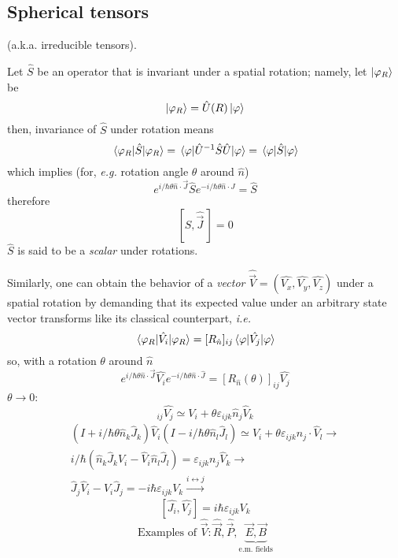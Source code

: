 \documentclass[12pt]{article}
\newcommand{\be}{\begin{equation}}
\newcommand{\ee}{\end{equation}}
\begin{document}
\subsection{Spherical tensors}

(a.k.a. irreducible tensors).

Let $\hat{S}$ be an operator that is invariant under a
spatial rotation; namely, let $\ket{\varphi_R}$ be
\be
\ket{\varphi_R} = \hat{U}(R)\ket{\varphi}
\ee
then, invariance of $\hat{S}$ under rotation means
\be
\ev*{\hat{S}}{\varphi_R} = \ev*{\hat{U}^{-1}\hat{S}\hat{U}} {\varphi}= \ev*{\hat{S}}{\varphi}
\ee
which implies (for, \textit{e.g.} rotation angle $\theta$ around $\hat{n}$)
\be
e^{i / \hbar \theta \hat{n} \cdot \vec{J}} \hat{S} e^{-i / \hbar \theta \hat{n} \cdot \hat{J}}=\hat{S}
\ee
therefore
\be
\left[\hat{S},\hat{\vec{J}}\,\right] = 0
\ee
$\hat{S}$ is said to be a \emph{scalar} under rotations.

Similarly, one can obtain the behavior of a \emph{vector}
$\hat{\vec{V}} = (\hat{V_x},\hat{V_y},\hat{V_z})$ under a spatial rotation by
demanding that its expected value under an
arbitrary state vector transforms like its classical
counterpart, \textit{i.e.}
\be
\ev*{\hat{V_i}}{\varphi_R} = [R_{\hat n}]_{ij}\ev*{\hat{V_j}}{\varphi}
\ee
so, with a rotation $\theta$ around $\hat{n}$
\be
e^{i / \hbar \theta \hat{n} \cdot \vec{J}} \hat{V_i} e^{-i / \hbar \theta \hat{n} \cdot \hat{J}}=
[R_{\hat n}(\theta)]_{ij}\hat{V_j}
\ee
$\theta \to 0$:
\be
[R_{\hat n}(\theta)]_{ij}\hat{V_j}
\simeq V_i + \theta \varepsilon_{i j k} \hat{n}_{j} \hat{V}_{k}
\ee
\[
\begin{gathered}
\left(I+i / \hbar \theta \hat{n}_{k} \hat{J}_{k}\right) \hat{V}_{i}\left(I-i / \hbar \theta \hat{n}_{l} \hat{J}_{l}\right) \simeq V_{i}+\theta \varepsilon_{i j k} \hat{n}_{j} \cdot \hat{V}_{l} \to\\
i / \hbar\left(\hat{n}_{k} \hat{J}_{k} V_{i}-\hat{V}_{i} \hat{n}_{l} \hat{J}_{l}\right)=\varepsilon_{i j k} n_{j} \hat{V}_{k} \to\\
\hat{J}_{j} \hat{V}_{i}-V_{i} \hat{J}_{j}=-i \hbar \varepsilon_{i j k} V_{k} \xrightarrow{{i\leftrightarrow j}}
\end{gathered}
\]
\be
\boxed{
\left[\hat{J_{i}}, \hat{V_{j}}\right]=i \hbar \varepsilon_{i j k} V_{k}
}
\ee
\be
\text{Examples of } \hat{\vec{V}}: \hat{\vec{R}}, \hat{\vec{P}}, \underbrace{\vec{E}, \vec{B}}_{\text{e.m. fields}}
\ee
\end{document}
